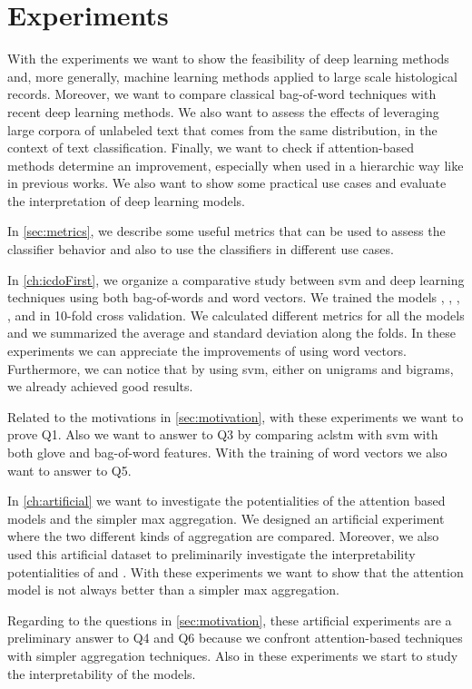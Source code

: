 \chapter{Experiments}
With the experiments we want to show the feasibility of deep learning
methods and, more generally, machine learning methods applied to large
scale histological records. Moreover, we want to compare classical
bag-of-word techniques with recent deep learning methods. We also want
to assess the effects of leveraging large corpora of unlabeled text
that comes from the same distribution, in the context of text
classification. Finally, we want to check if attention-based methods
determine an improvement, especially when used in a hierarchic way
like in
previous works. We also want to show some practical use cases and
evaluate the interpretation of deep learning models.

In \cref{sec:metrics}, we describe some useful metrics that can
be used to assess the 
classifier behavior and also to use the classifiers in different use
cases.

In \cref{ch:icdoFirst}, we organize a comparative study between
\ac{svm} and deep learning techniques using both bag-of-words and word
vectors. We trained the models \svm, \svmb, \lstmng, \lstmc, and
\lstmb in 10-fold cross validation. We calculated 
different metrics for all the models and we summarized the average and
standard deviation 
along the folds. In these
experiments we can appreciate the improvements of using word
vectors. Furthermore, we can notice that by using \ac{svm}, either on
unigrams and bigrams, we already achieved good results.

Related to the motivations in \cref{sec:motivation}, with these
experiments we want to prove Q1. Also we want to answer to Q3 by
comparing ac{lstm} with
\ac{svm} with both \ac{glove} and bag-of-word features.  
With the training of word vectors we also want to answer to Q5.

In \ref{ch:artificial} we want to investigate the potentialities of
the attention based models and the simpler max aggregation. We
designed an artificial experiment where the two different
kinds of aggregation are compared. Moreover, we also used this artificial
dataset to preliminarily investigate the interpretability
potentialities of \maxi{} and \softmaxi{}. With these experiments we
want to show that the attention model is not always better than a
simpler max aggregation.

Regarding to the questions in \cref{sec:motivation}, these
artificial experiments are a preliminary answer to Q4 and Q6 because
we confront attention-based techniques with simpler aggregation
techniques. Also in these experiments we start to study the
interpretability of the models. 

